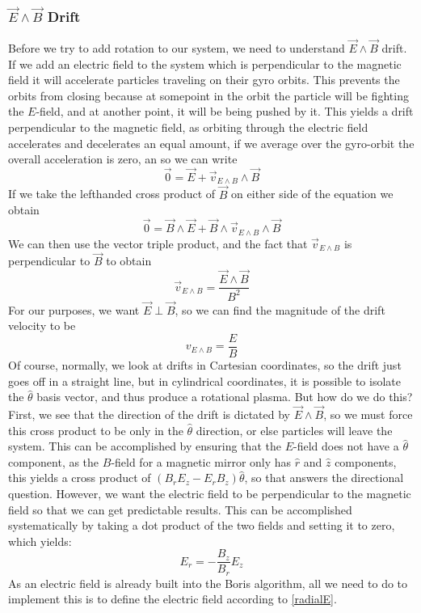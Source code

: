 \documentclass[12pt]{article}
\begin{document}
\subsubsection{$\vec{E}\wedge\vec{B}$ Drift}
Before we try to add rotation to our system, we need to understand $\vec{E}\wedge\vec{B}$ drift. If we add an electric field to the system which is perpendicular to the magnetic field it will accelerate particles traveling on their gyro orbits. This prevents the orbits from closing because at somepoint in the orbit the particle will be fighting the $E$-field, and at another point, it will be being pushed by it. This yields a drift perpendicular to the magnetic field, as orbiting through the electric field accelerates and decelerates an equal amount, if we average over the gyro-orbit the overall acceleration is zero, an so we can write
$$\vec{0}=\vec{E}+\vec{v}_{E\wedge B}\wedge\vec{B}$$
If we take the lefthanded cross product of $\vec{B}$ on either side of the equation we obtain
$$\vec{0}=\vec{B}\wedge\vec{E}+\vec{B}\wedge\vec{v}_{E\wedge B}\wedge\vec{B}$$
We can then use the vector triple product, and the fact that $\vec{v}_{E\wedge B}$ is perpendicular to $\vec{B}$ to obtain
\begin{equation}\label{EcrossB}
\vec{v}_{E\wedge B}=\frac{\vec{E}\wedge\vec{B}}{B^2}
\end{equation} 
For our purposes, we want $\vec{E}\perp\vec{B}$, so we can find the magnitude of the drift velocity to be
\begin{equation}\label{driftmag}
v_{E\wedge B}=\frac{E}{B}
\end{equation} 
Of course, normally, we look at drifts in Cartesian coordinates, so the drift just goes off in a straight line, but in cylindrical coordinates, it is possible to isolate the $\hat{\theta}$ basis vector, and thus produce a rotational plasma. But how do we do this? First, we see that the direction of the drift is dictated by $\vec{E}\wedge\vec{B}$, so we must force this cross product to be only in the $\hat{\theta}$ direction, or else particles will leave the system. This can be accomplished by ensuring that the $E$-field does not have a $\hat{\theta}$ component, as the $B$-field for a magnetic mirror only has $\hat{r}$ and $\hat{z}$ components, this yields a cross product of $(B_rE_z-E_rB_z)\hat{\theta}$, so that answers the directional question. However, we want the electric field to be perpendicular to the magnetic field so that we can get predictable results. This can be accomplished systematically by taking a dot product of the two fields and setting it to zero, which yields:
\begin{equation}\label{radialE}
E_r=-\frac{B_z}{B_r}E_z
\end{equation}
As an electric field is already built into the Boris algorithm, all we need to do to implement this is to define the electric field according to \eqref{radialE}.
\end{document}
